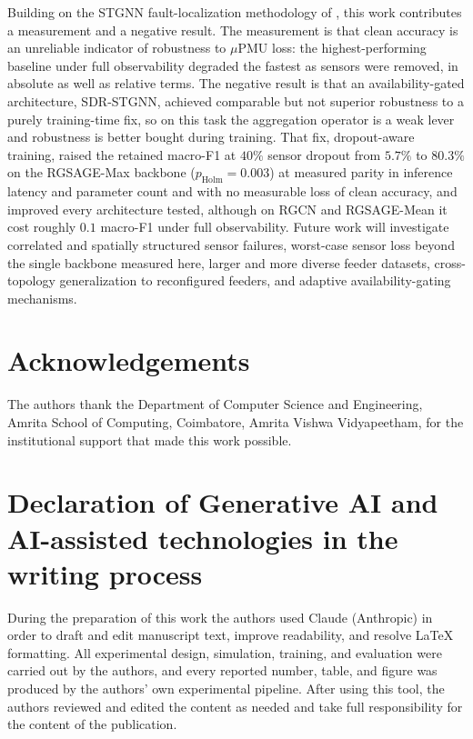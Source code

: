 \documentclass[3p,times,procedia]{elsarticle}
\begin{document}
Building on the STGNN fault-localization methodology of \cite{Karabulut2026}, this work contributes a measurement and a negative result. The measurement is that clean accuracy is an unreliable indicator of robustness to $\mu$PMU loss: the highest-performing baseline under full observability degraded the fastest as sensors were removed, in absolute as well as relative terms. The negative result is that an availability-gated architecture, SDR-STGNN, achieved comparable but not superior robustness to a purely training-time fix, so on this task the aggregation operator is a weak lever and robustness is better bought during training. That fix, dropout-aware training, raised the retained macro-F1 at $40\%$ sensor dropout from $5.7\%$ to $80.3\%$ on the RGSAGE-Max backbone ($p_{\text{Holm}}=0.003$) at measured parity in inference latency and parameter count and with no measurable loss of clean accuracy, and improved every architecture tested, although on RGCN and RGSAGE-Mean it cost roughly $0.1$ macro-F1 under full observability. Future work will investigate correlated and spatially structured sensor failures, worst-case sensor loss beyond the single backbone measured here, larger and more diverse feeder datasets, cross-topology generalization to reconfigured feeders, and adaptive availability-gating mechanisms.

\section*{Acknowledgements}

The authors thank the Department of Computer Science and Engineering, Amrita School of Computing, Coimbatore, Amrita Vishwa Vidyapeetham, for the institutional support that made this work possible.

\section*{Declaration of Generative AI and AI-assisted technologies in the writing process}

During the preparation of this work the authors used Claude (Anthropic) in order to draft and edit manuscript text, improve readability, and resolve LaTeX formatting. All experimental design, simulation, training, and evaluation were carried out by the authors, and every reported number, table, and figure was produced by the authors' own experimental pipeline. After using this tool, the authors reviewed and edited the content as needed and take full responsibility for the content of the publication.
\end{document}
